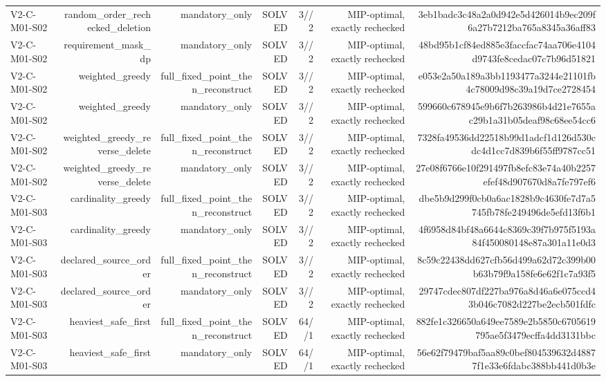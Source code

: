 {\begin{longtable}{lrrrrrr}
V2-C-M01-S02 & random\_order\_rechecked\_deletion & mandatory\_only & SOLVED & 3//2 & MIP-optimal, exactly rechecked & 3eb1badc3c48a2a0d942e5d426014b9ec209f6a27b7212ba765a8345a36aff83 \\
V2-C-M01-S02 & requirement\_mask\_dp & mandatory\_only & SOLVED & 3//2 & MIP-optimal, exactly rechecked & 48bd95b1cf84ed885e3faccfac74aa706e4104d9743fe8cedac07c7b96d51821 \\
V2-C-M01-S02 & weighted\_greedy & full\_fixed\_point\_then\_reconstruct & SOLVED & 3//2 & MIP-optimal, exactly rechecked & e053e2a50a189a3bb1193477a3244e21101fb4c78009d98c39a19d7ce2728454 \\
V2-C-M01-S02 & weighted\_greedy & mandatory\_only & SOLVED & 3//2 & MIP-optimal, exactly rechecked & 599660c678945e9b6f7b263986b4d21e7655ac29b1a31b05deaf98c68ee54cc6 \\
V2-C-M01-S02 & weighted\_greedy\_reverse\_delete & full\_fixed\_point\_then\_reconstruct & SOLVED & 3//2 & MIP-optimal, exactly rechecked & 7328fa49536dd22518b99d1adcf1d126d530cdc4d1cc7d839b6f55ff9787cc51 \\
V2-C-M01-S02 & weighted\_greedy\_reverse\_delete & mandatory\_only & SOLVED & 3//2 & MIP-optimal, exactly rechecked & 27e08f6766e10f291497fb8efc83e74a40b2257efef48d907670d8a7fe797ef6 \\
V2-C-M01-S03 & cardinality\_greedy & full\_fixed\_point\_then\_reconstruct & SOLVED & 3//2 & MIP-optimal, exactly rechecked & dbe5b9d299f0cb0a6ac1828b9c4630fe7d7a5745fb78fe249496de5efd13f6b1 \\
V2-C-M01-S03 & cardinality\_greedy & mandatory\_only & SOLVED & 3//2 & MIP-optimal, exactly rechecked & 4f6958d84bf48a6644c8369c39f7b975f5193a84f450080148e87a301a11e0d3 \\
V2-C-M01-S03 & declared\_source\_order & full\_fixed\_point\_then\_reconstruct & SOLVED & 3//2 & MIP-optimal, exactly rechecked & 8c59c22438dd627cfb56d499a62d72c399b00b63b79f9a158fe6e62f1c7a93f5 \\
V2-C-M01-S03 & declared\_source\_order & mandatory\_only & SOLVED & 3//2 & MIP-optimal, exactly rechecked & 29747cdec807df227ba976a8d46a6e075ccd43b046c7082d227be2ecb501fdfc \\
V2-C-M01-S03 & heaviest\_safe\_first & full\_fixed\_point\_then\_reconstruct & SOLVED & 64//1 & MIP-optimal, exactly rechecked & 882fe1c326650a649ee7589e2b5850c6705619795ae5f3479ecffa4dd3131bbc \\
V2-C-M01-S03 & heaviest\_safe\_first & mandatory\_only & SOLVED & 64//1 & MIP-optimal, exactly rechecked & 56e62f79479baf5aa89c0bef804539632d48877f1e33e6fdabc388bb441d0b3e \\

\end{longtable}}
